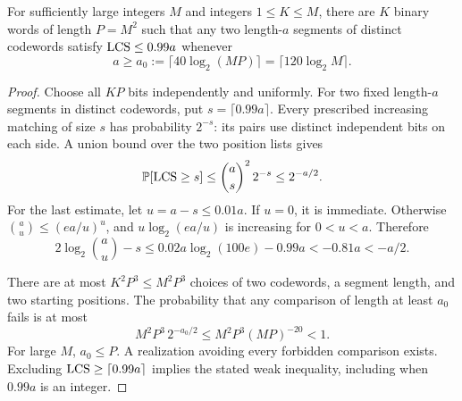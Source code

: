 \begin{lemma}\label{lem:random-segments}
For sufficiently large integers $M$ and integers $1\leq K\leq M$,
there are $K$ binary words
of length $P=M^2$ such that any two length-$a$ segments of distinct
codewords satisfy $\operatorname{LCS}\leq0.99a$ whenever
\[
 a\geq a_0:=\lceil40\log_2(MP)\rceil
 =\lceil120\log_2M\rceil.
\]
\end{lemma}
\begin{proof}
Choose all $KP$ bits independently and uniformly. For two fixed
length-$a$ segments in distinct codewords, put $s=\lceil0.99a\rceil$.
Every prescribed increasing matching of size $s$ has probability
$2^{-s}$: its pairs use distinct independent bits on each side.
A union bound over the two position lists gives
\[
 \mathbb P[\operatorname{LCS}\geq s]\leq\binom as^2\,2^{-s}\leq2^{-a/2}.
\]
For the last estimate, let $u=a-s\leq0.01a$. If $u=0$, it is immediate.
Otherwise $\binom au\leq(ea/u)^u$, and
$u\log_2(ea/u)$ is increasing for $0<u<a$. Therefore
\[
 2\log_2\binom au-s
 \leq0.02a\log_2(100e)-0.99a<-0.81a<-a/2.
\]

There are at most $K^2P^3\leq M^2P^3$ choices of two codewords, a
segment length, and two starting positions. The probability that any
comparison of length at least $a_0$ fails is at most
\[
 M^2P^3\,2^{-a_0/2}
 \leq M^2P^3(MP)^{-20}<1.
\]
For large $M$, $a_0\leq P$. A realization avoiding every forbidden
comparison exists. Excluding $\operatorname{LCS}\geq\lceil0.99a\rceil$ implies
the stated weak inequality, including when $0.99a$ is an integer.
\end{proof}

